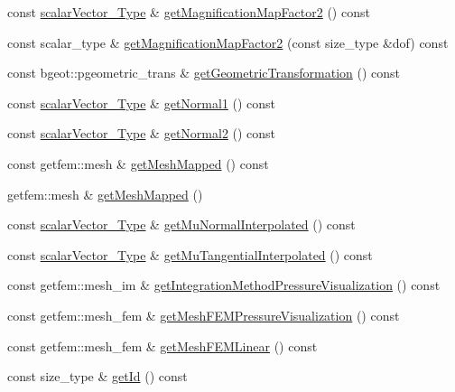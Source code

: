 \begin{DoxyCompactItemize}
\item 
const \hyperlink{Core_8h_a4e75b5863535ba1dd79942de2846eff0}{scalar\-Vector\-\_\-\-Type} \& \hyperlink{classFractureHandler_a68b09b4012669140979a0026736b3dfe}{get\-Magnification\-Map\-Factor2} () const 
\item 
const scalar\-\_\-type \& \hyperlink{classFractureHandler_a5bbe076a3595909f6af49e8d69e39231}{get\-Magnification\-Map\-Factor2} (const size\-\_\-type \&dof) const 
\item 
const bgeot\-::pgeometric\-\_\-trans \& \hyperlink{classFractureHandler_a2e1d27efecfa84246375be5f4262bab2}{get\-Geometric\-Transformation} () const 
\item 
const \hyperlink{Core_8h_a4e75b5863535ba1dd79942de2846eff0}{scalar\-Vector\-\_\-\-Type} \& \hyperlink{classFractureHandler_a22e229a4016119138c48b456a185e1ff}{get\-Normal1} () const 
\item 
const \hyperlink{Core_8h_a4e75b5863535ba1dd79942de2846eff0}{scalar\-Vector\-\_\-\-Type} \& \hyperlink{classFractureHandler_ae707e764eaff191e2856765131289c82}{get\-Normal2} () const 
\item 
const getfem\-::mesh \& \hyperlink{classFractureHandler_a79b2fbb306b2bc045d5bef0b73d12ec8}{get\-Mesh\-Mapped} () const 
\item 
getfem\-::mesh \& \hyperlink{classFractureHandler_ad3fa0255b0e57f6562dc98bbf71588b1}{get\-Mesh\-Mapped} ()
\item 
const \hyperlink{Core_8h_a4e75b5863535ba1dd79942de2846eff0}{scalar\-Vector\-\_\-\-Type} \& \hyperlink{classFractureHandler_a6af2b5af4046d6a0eafbacaec96f8153}{get\-Mu\-Normal\-Interpolated} () const 
\item 
const \hyperlink{Core_8h_a4e75b5863535ba1dd79942de2846eff0}{scalar\-Vector\-\_\-\-Type} \& \hyperlink{classFractureHandler_a868f8aeaeec90df8211d091612e03593}{get\-Mu\-Tangential\-Interpolated} () const 
\item 
const getfem\-::mesh\-\_\-im \& \hyperlink{classFractureHandler_a157f39f66131faf579b980b6b5fb91fb}{get\-Integration\-Method\-Pressure\-Visualization} () const 
\item 
const getfem\-::mesh\-\_\-fem \& \hyperlink{classFractureHandler_ac78f500422e542b77114e56f11173b0d}{get\-Mesh\-F\-E\-M\-Pressure\-Visualization} () const 
\item 
const getfem\-::mesh\-\_\-fem \& \hyperlink{classFractureHandler_ab77ee6aaf47d7f1d80fd1ff23bd34a33}{get\-Mesh\-F\-E\-M\-Linear} () const 
\item 
const size\-\_\-type \& \hyperlink{classFractureHandler_a7f7ec5b15315791f76d8deb0874511d6}{get\-Id} () const 

\end{DoxyCompactItemize}
